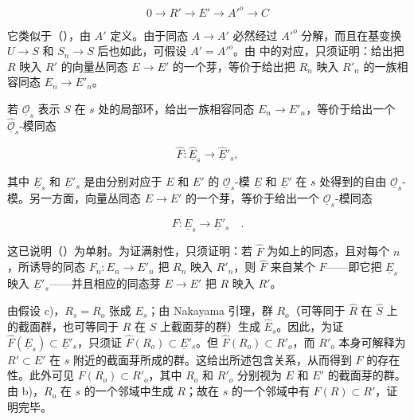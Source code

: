 \begin{equation*}
 0\longrightarrow R'\longrightarrow E'\longrightarrow {A'}^o
 \longrightarrow C
\end{equation*}

\noindent
它类似于（），由 $A'$ 定义。由于同态 $A\longrightarrow A'$ 必然经过 ${A'}^o$ 分解，而且在基变换 $U\longrightarrow S$ 和 $S_n\longrightarrow S$ 后也如此，可假设 $A'={A'}^o$。由  中的对应，只须证明：给出把 $R$ 映入 $R'$ 的向量丛同态 $E\longrightarrow E'$ 的一个芽，等价于给出把 $R_n$ 映入 $R'_n$ 的一族相容同态 $E_n\longrightarrow E'_n$。

若 $\underline{\mathcal O}_s$ 表示 $S$ 在 $s$ 处的局部环，给出一族相容同态 $E_n\longrightarrow E'_n$，等价于给出一个 $\widehat{\underline{\mathcal O}}_s$-模同态

\begin{equation*}
 \widehat F:\widehat{\underline E}_s
 \longrightarrow\widehat{\underline E}'_s,
\end{equation*}

\noindent
其中 $\underline E_s$ 和 $\underline E'_s$ 是由分别对应于 $E$ 和 $E'$ 的 $\underline{\mathcal O}_s$-模 $\underline E$ 和 $\underline E'$ 在 $s$ 处得到的自由 $\underline{\mathcal O}_s$-模。另一方面，向量丛同态 $E\longrightarrow E'$ 的一个芽，等价于给出一个 $\underline{\mathcal O}_s$-模同态

\begin{equation*}
 F:\underline E_s\longrightarrow\underline E'_s\quad .
\end{equation*}

\noindent
这已说明（）为单射。为证满射性，只须证明：若 $\widehat F$ 为如上的同态，且对每个 $n$，所诱导的同态 $F_n:E_n\longrightarrow E'_n$ 把 $R_n$ 映入 $R'_n$，则 $\widehat F$ 来自某个 $F$——即它把 $\underline E_s$ 映入 $\underline E'_s$——并且相应的同态芽 $E\longrightarrow E'$ 把 $R$ 映入 $R'$。

由假设 c)，$R_s=R_o$ 张成 $E_s$；由 Nakayama 引理，群 $R_o$（可等同于 $\widehat R$ 在 $\widehat S$ 上的截面群，也可等同于 $R$ 在 $S$ 上截面芽的群）生成 $\widehat E_s$。因此，为证 $\widehat F(\underline E_s)\subset\underline E'_s$，只须证 $\widehat F(R_o)\subset\underline E'_s$。但 $\widehat F(R_o)\subset R'_o$，而 $R'_o$ 本身可解释为 $R'\subset E'$ 在 $s$ 附近的截面芽所成的群。这给出所述包含关系，从而得到 $F$ 的存在性。此外可见 $F(R_o)\subset R'_o$，其中 $R_o$ 和 $R'_o$ 分别视为 $E$ 和 $E'$ 的截面芽的群。由 b)，$R_o$ 在 $s$ 的一个邻域中生成 $R$；故在 $s$ 的一个邻域中有 $F(R)\subset R'$，证明完毕。

